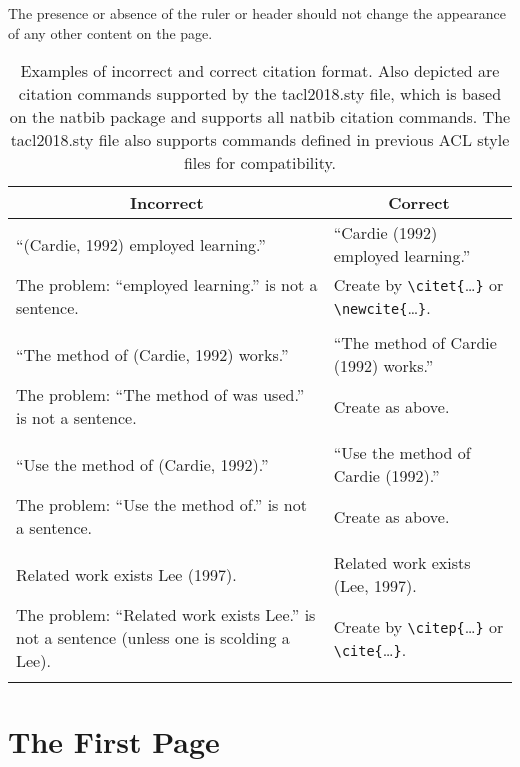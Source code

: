 \documentclass[11pt,a4paper]{article}
\newcommand{\ex}[1]{{\sf #1}}
\begin{document}
The presence or absence of the ruler or header should not change the appearance
of any other content on the page.



\begin{table*}[t]
\centering
\begin{tabular}{p{7.8cm}@{\hskip .5cm}p{7.8cm}}
\multicolumn{1}{c}{{\bf Incorrect}} & \multicolumn{1}{c}{{\bf Correct}} \\  \hline
``\ex{(Cardie, 1992) employed learning.}'' &
``\ex{Cardie (1992) employed learning.}'' \\
{The problem}:  ``employed learning.'' is not a sentence.  & Create by
\verb+\citet{+\ldots\verb+}+  or \verb+\newcite{+\ldots\verb+}+. \\
\\  \hline
``\ex{The method of (Cardie, 1992) works.}'' &
``\ex{The method of Cardie (1992) works.}''  \\
{The problem}:  ``The method of was used.'' is not a sentence.  & Create as
above.\\ \\\hline
``\ex{Use the method of (Cardie, 1992).}'' &
``\ex{Use the method of Cardie (1992).}''  \\
{The problem}:  ``Use the method of.'' is not a sentence.  & Create as
above.\\ \\\hline
\ex{Related work exists Lee (1997).} & \ex{Related work exists (Lee,
1997).} \\
{The problem}:  ``Related work exists Lee.'' is not a sentence (unless one
is scolding a Lee). & Create by
\verb+\citep{+\ldots\verb+}+  or \verb+\cite{+\ldots\verb+}+. \\
\\  \hline
\end{tabular}
\caption{\label{tab:cite-commands} Examples of incorrect and correct citation
  format.  Also depicted are citation commands supported by the
  tacl2018.sty file, which is based on the natbib package and
  supports all natbib citation commands.
  The tacl2018.sty file also supports commands defined in previous ACL style
  files
  for compatibility.
  }
\end{table*}





\section{The First Page}
\label{ssec:first}
\end{document}
